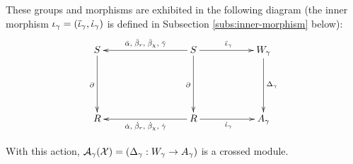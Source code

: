 These groups and morphisms are exhibited in the following diagram 
(the inner morphism $\iota_{\gamma} = (\ddot{\iota}_{\gamma},\dot{\iota}_{\gamma})$ 
is defined in Subsection \ref{subs:inner-morphism} below):
\begin{equation} \label{eq:sqX}
\vcenter{\xymatrix{
  S \ar[dd]_{\partial}
    &&&  S \ar[lll]_{\dda,\;\ddb_r,\;\ddb_{\chi},\;\ddg} 
            \ar[dd]_{\partial} \ar[rr]^{\ddi_{\gamma}}
         &&  W_{\gamma}  \ar[dd]^{\Delta_{\gamma}}   \\
    &&& &&   \\
  R
    &&&  R \ar[lll]^{\da,\;\db_r,\;\db_{\chi},\;\dg} 
            \ar[rr]_{\di_{\gamma}}
         &&  A_{\gamma} \\
}} 
\end{equation}

\begin{thm}
With this action, 
$\mathcal{A}_{\gamma}(\mathcal{X}) = (\Delta_{\gamma} : W_{\gamma} \to A_{\gamma})$ 
is a crossed module.
\end{thm}
